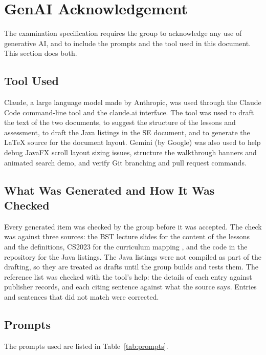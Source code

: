 \section{GenAI Acknowledgement}\label{sec:id-genai}


The examination specification requires the group to acknowledge any use of generative AI, and to include the prompts and the tool used in this document. This section does both.

\subsection{Tool Used}
Claude, a large language model made by Anthropic, was used through the Claude Code command-line tool and the claude.ai interface. The tool was used to draft the text of the two documents, to suggest the structure of the lessons and assessment, to draft the Java listings in the SE document, and to generate the LaTeX source for the document layout. Gemini (by Google) was also used to help debug JavaFX scroll layout sizing issues, structure the walkthrough banners and animated search demo, and verify Git branching and pull request commands.

\subsection{What Was Generated and How It Was Checked}
Every generated item was checked by the group before it was accepted. The check was against three sources: the BST lecture slides for the content of the lessons and the definitions, CS2023 for the curriculum mapping \cite{Kumar2024}, and the code in the repository for the Java listings. The Java listings were not compiled as part of the drafting, so they are treated as drafts until the group builds and tests them. The reference list was checked with the tool's help: the details of each
entry against publisher records, and each citing sentence against what the
source says. Entries and sentences that did not match were corrected.

\subsection{Prompts}
The prompts used are listed in Table~\ref{tab:prompts}. 

